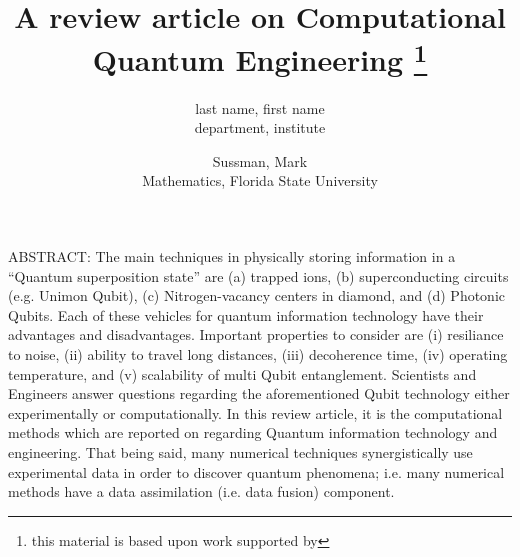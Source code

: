 \documentclass[]{article}
\title{A review article on Computational Quantum Engineering
  \thanks{this material is based upon work supported by }}
\author{
  last name, first name \\
  department, institute
  \and
  Sussman, Mark \\
  Mathematics, Florida State University
}
\begin{document}
\maketitle

ABSTRACT:
The main techniques in physically storing information in a ``Quantum superposition state'' are (a) trapped ions, (b) superconducting circuits (e.g. Unimon Qubit), (c) Nitrogen-vacancy centers in diamond, and (d) Photonic Qubits.  Each of these vehicles for quantum information technology  have their advantages and disadvantages.  Important properties to consider are (i) resiliance to noise, (ii) ability to travel long distances, (iii) decoherence time, (iv) operating temperature, and (v) scalability of multi Qubit entanglement.  Scientists and Engineers answer questions regarding the aforementioned Qubit technology either experimentally or computationally.  In this review article, it is the computational methods which are reported on regarding Quantum information technology and engineering.  That being said, many numerical techniques synergistically use experimental data in order to discover quantum phenomena; i.e. many numerical methods have a data assimilation (i.e. data fusion) component.   

\linenumbers
\end{document}
